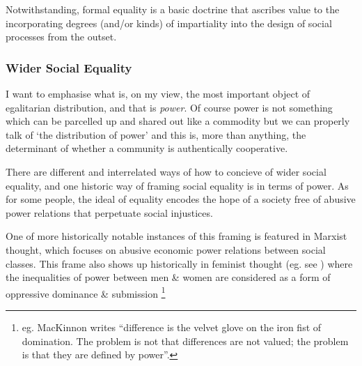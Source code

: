 Notwithstanding, formal equality is a basic doctrine that ascribes value to the incorporating degrees (and/or kinds) of impartiality into the design of social processes from the outset.%

\subsubsection{Wider Social Equality}

\begin{displayquote}
I want to emphasise what is, on my view, the most important object of egalitarian distribution, and that is \textit{power}. Of course power is not something which can be parcelled up and shared out like a commodity but we can properly talk of `the distribution of power' and this is, more than anything, the determinant of whether a community is authentically cooperative.\cite{TheSocialBasisofEquality:1998}
\end{displayquote}

There are different and interrelated ways of how to concieve of wider social equality, and one historic way of framing social equality is in terms of power.
As for some people, the ideal of equality encodes the hope of a society free of abusive power relations that perpetuate social injustices.

One of more historically notable instances of this framing is featured in Marxist thought, which focuses on abusive economic power relations between social classes. This frame also shows up historically in feminist thought (eg. see \cite{Cudd2006-CUDAO}) where the inequalities of power between men \& women are considered as a form of oppressive dominance \& submission \footnote{eg. MacKinnon writes ``difference is the velvet glove on the iron fist of domination. The problem is not that differences are not valued; the problem is that they are defined by power''\cite{mackinnon1989toward}.}

